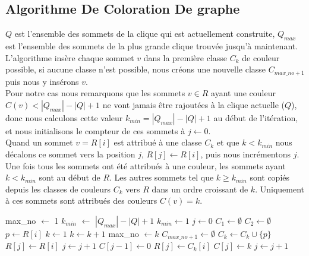 \documentclass{article}
\begin{document}
\subsection{Algorithme De Coloration De graphe}
$Q$ est l'ensemble des sommets de la clique qui est actuellement construite, $Q_{max}$
est l'ensemble des sommets de la plus grande clique trouvée jusqu'à maintenant.\\
L'algorithme insère chaque sommet $v$ dans la première classe $C_k$ de couleur possible, si aucune
classe n'est possible, nous créons une nouvelle classe $C_{max\_no+1}$ puis nous y insérons $v$.\\
Pour notre cas nous remarquons que les sommets $ v \in R$ ayant une couleur $C(v) < |Q_{max}|-|Q|+1$
ne vont jamais être rajoutées à la clique actuelle ($Q$), donc nous calculons cette valeur
$k_{min}=|Q_{max}|-|Q|+1$ au début de l'itération, et nous initialisons le compteur de ces sommets à
$j \gets 0$.\\
Quand un sommet $v=R[i]$ est attribué à une classe $C_k$ et que $k<k_{min}$ nous décalons ce sommet
vers la position $j$, $R[j] \gets R[i]$, puis nous incrémentons $j$. \\
Une fois tous les sommets ont été attribués à une couleur, les sommets ayant $k<k_{min}$ sont au début
de $R$. Les autres sommets tel que $k \geq k_{min}$ sont copiés depuis les classes de couleurs $C_k$
vers $R$ dans un ordre croissant de $k$. Uniquement à ces sommets sont attribués des couleurs $C(v)=k$.

\begin{algorithm}
\begin{algorithmic}
  \State max\_no $\gets$ 1
  \State $k_{min}$ $\gets$ $|Q_{max}| - |Q|+1$
    \State $k_{min} \gets 1$
  \EndIf
  \State $j \gets 0$
  \State $C_1 \gets \emptyset$ $C_2 \gets \emptyset$
    \State $p \gets R[i]$
    \State $k \gets 1$
      \State $k \gets k+1$
    \EndWhile
      \State max\_no $\gets k$
      \State $C_{max\_no+1} \gets \emptyset $
    \EndIf
    \State $C_k \gets C_k \cup \{p\}$
      \State $R[j] \gets R[i]$
      \State $j \gets j+1$
    \EndIf
  \EndFor
  \State $C[j-1] \gets 0$
      \State $R[j] \gets C_k[i]$
      \State $C[j] \gets k$
      \State $j \gets j+1$
    \EndFor
  \EndFor
\EndProcedure
\end{algorithmic}
\end{algorithm}
\end{document}

